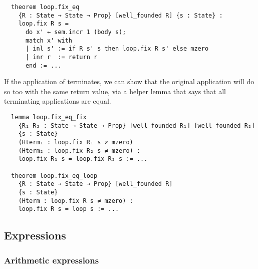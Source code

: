 \begin{verbatim}
  theorem loop.fix_eq
    {R : State → State → Prop} [well_founded R] {s : State} :
    loop.fix R s =
      do x' ← sem.incr 1 (body s);
      match x' with
      | inl s' := if R s' s then loop.fix R s' else mzero
      | inr r  := return r
      end := ...
\end{verbatim}

If the application of  terminates, we can show that the original
application  will do so too with the same return value,
via a helper lemma that says that all terminating  applications are equal.

\begin{verbatim}
  lemma loop.fix_eq_fix
    {R₁ R₂ : State → State → Prop} [well_founded R₁] [well_founded R₂]
    {s : State}
    (Hterm₁ : loop.fix R₁ s ≠ mzero)
    (Hterm₂ : loop.fix R₂ s ≠ mzero) :
    loop.fix R₁ s = loop.fix R₂ s := ...

  theorem loop.fix_eq_loop
    {R : State → State → Prop} [well_founded R]
    {s : State}
    (Hterm : loop.fix R s ≠ mzero) :
    loop.fix R s = loop s := ...
\end{verbatim}

\subsection{Expressions}

\subsubsection{Arithmetic expressions}
\label{sec:arith}